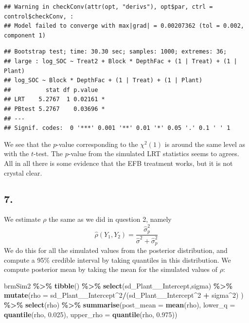 \documentclass[
]{article}
\newenvironment{Shaded}{\begin{snugshade}}{\end{snugshade}}
\newcommand{\AttributeTok}[1]{\textcolor[rgb]{0.13,0.29,0.53}{#1}}
\newcommand{\DecValTok}[1]{\textcolor[rgb]{0.00,0.00,0.81}{#1}}
\newcommand{\FloatTok}[1]{\textcolor[rgb]{0.00,0.00,0.81}{#1}}
\newcommand{\FunctionTok}[1]{\textcolor[rgb]{0.13,0.29,0.53}{\textbf{#1}}}
\newcommand{\NormalTok}[1]{#1}
\newcommand{\SpecialCharTok}[1]{\textcolor[rgb]{0.81,0.36,0.00}{\textbf{#1}}}
\begin{document}
\begin{verbatim}
## Warning in checkConv(attr(opt, "derivs"), opt$par, ctrl = control$checkConv, :
## Model failed to converge with max|grad| = 0.00207362 (tol = 0.002, component 1)
\end{verbatim}

\begin{verbatim}
## Bootstrap test; time: 30.30 sec; samples: 1000; extremes: 36;
## large : log_SOC ~ Treat2 + Block * DepthFac + (1 | Treat) + (1 | Plant)
## log_SOC ~ Block * DepthFac + (1 | Treat) + (1 | Plant)
##          stat df p.value  
## LRT    5.2767  1 0.02161 *
## PBtest 5.2767    0.03696 *
## ---
## Signif. codes:  0 '***' 0.001 '**' 0.01 '*' 0.05 '.' 0.1 ' ' 1
\end{verbatim}

We see that the \(p\)-value corresponding to the \(\chi^2(1)\) is around
the same level as with the \(t\)-test. The \(p\)-value from the
simulated LRT statistics seems to agrees. All in all there is some
evidence that the EFB treatment works, but it is not crystal clear.

\hypertarget{section-10}{%
\subsection{7.}\label{section-10}}

We estimate \(\rho\) the same as we did in question 2, namely \[
\hat{\rho}(Y_1, Y_2) = \frac{\hat{\sigma}^2_p}{\hat{\sigma}^2 + \hat{\sigma}^2_p} 
\] We do this for all the simulated values from the posterior
distribution, and compute a 95\% credible interval by taking quantiles
in this distribution. We compute posterior mean by taking the mean for
the simulated values of \(\rho\):

\begin{Shaded}
\begin{Highlighting}[]
\NormalTok{brmSim2 }\SpecialCharTok{\%\textgreater{}\%} \FunctionTok{tibble}\NormalTok{() }\SpecialCharTok{\%\textgreater{}\%} 
  \FunctionTok{select}\NormalTok{(sd\_Plant\_\_Intercept,sigma) }\SpecialCharTok{\%\textgreater{}\%} 
  \FunctionTok{mutate}\NormalTok{(}\AttributeTok{rho =}\NormalTok{ sd\_Plant\_\_Intercept}\SpecialCharTok{\^{}}\DecValTok{2}\SpecialCharTok{/}\NormalTok{(sd\_Plant\_\_Intercept}\SpecialCharTok{\^{}}\DecValTok{2} \SpecialCharTok{+}\NormalTok{ sigma}\SpecialCharTok{\^{}}\DecValTok{2}\NormalTok{) ) }\SpecialCharTok{\%\textgreater{}\%}
  \FunctionTok{select}\NormalTok{(rho) }\SpecialCharTok{\%\textgreater{}\%} 
  \FunctionTok{summarise}\NormalTok{(}\AttributeTok{post\_mean =} \FunctionTok{mean}\NormalTok{(rho), }\AttributeTok{lower\_q =} \FunctionTok{quantile}\NormalTok{(rho, }\FloatTok{0.025}\NormalTok{), }\AttributeTok{upper\_rho =} \FunctionTok{quantile}\NormalTok{(rho, }\FloatTok{0.975}\NormalTok{))}
\end{Highlighting}
\end{Shaded}
\end{document}
